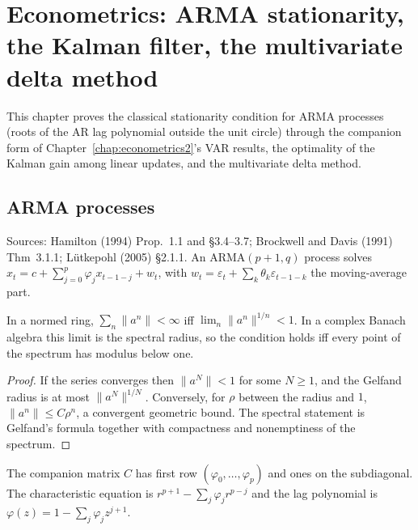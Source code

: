 \chapter{Econometrics: ARMA stationarity, the Kalman filter, the multivariate delta method}
\label{chap:econometrics5}

This chapter proves the classical stationarity condition for ARMA processes (roots of the AR lag polynomial outside
the unit circle) through the companion form of Chapter~\ref{chap:econometrics2}'s VAR results, the optimality of the
Kalman gain among linear updates, and the multivariate delta method.

\section{ARMA processes}
\label{sec:arma}

Sources: Hamilton (1994) Prop.~1.1 and \S3.4--3.7; Brockwell and Davis (1991) Thm~3.1.1; L\"utkepohl (2005) \S2.1.1.
An ARMA$(p+1,q)$ process solves $x_t = c + \sum_{j=0}^{p}\varphi_jx_{t-1-j} + w_t$, with $w_t = \varepsilon_t +
\sum_k\theta_k\varepsilon_{t-1-k}$ the moving-average part.

\begin{lemma}
\label{lem:gelfand-stability}
\leanok
In a normed ring, $\sum_n\|a^n\| < \infty$ iff $\lim_n\|a^n\|^{1/n} < 1$. In a complex Banach algebra this limit is the
spectral radius, so the condition holds iff every point of the spectrum has modulus below one.
\end{lemma}
\begin{proof}
\leanok
If the series converges then $\|a^N\| < 1$ for some $N\ge1$, and the Gelfand radius is at most $\|a^N\|^{1/N}$.
Conversely, for $\rho$ between the radius and $1$, $\|a^n\|\le C\rho^n$, a convergent geometric bound. The spectral
statement is Gelfand's formula together with compactness and nonemptiness of the spectrum.
\end{proof}

\begin{definition}
\label{def:companion}
\leanok
The companion matrix $C$ has first row $(\varphi_0,\dots,\varphi_p)$ and ones on the subdiagonal. The characteristic
equation is $r^{p+1} - \sum_j\varphi_jr^{p-j}$ and the lag polynomial is $\varphi(z) = 1 - \sum_j\varphi_jz^{j+1}$.
\end{definition}

